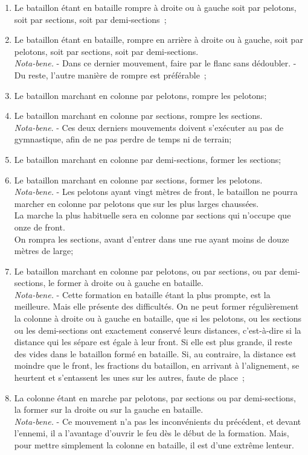 \documentclass[french,twoside]{book} %
\begin{document}
\begin{enumerate}[itemsep=0pt,]
\item Le bataillon étant en bataille rompre à droite ou à gauche soit par pelotons, soit par sections, soit par demi-sections ;
\item Le bataillon étant en bataille, rompre en arrière à droite ou à gauche, soit par pelotons, soit par sections, soit par demi-sections. \\
\emph{Nota-bene.} - Dans ce dernier mouvement, faire par le flanc sans dédoubler. - Du reste, l’autre manière de rompre est préférable ;
\item Le bataillon marchant en colonne par pelotons, rompre les pelotons;
\item Le bataillon marchant en colonne par sections, rompre les sections. \\
\emph{Nota-bene}. - Ces deux derniers mouvements doivent s’exécuter au pas de gymnastique, afin de ne pas perdre de temps ni de terrain;
\item Le bataillon marchant en colonne par demi-sections, former les sections;
\item Le bataillon marchant en colonne par sections, former les pelotons. \\
\emph{Nota-bene.} - Les pelotons ayant vingt mètres de front, le bataillon ne pourra marcher en colonne par pelotons que sur les plus larges chaussées. \\
La marche la plus habituelle sera en colonne par sections qui n’occupe que onze de front. \\
On rompra les sections, avant d’entrer dans une rue ayant moins de douze mètres de large;
\item Le bataillon marchant en colonne par pelotons, ou par sections, ou par demi-sections, le former à droite ou à gauche en bataille.\emph{ \\
Nota-bene.} - Cette formation en bataille étant la plus prompte, est la meilleure. Mais elle présente des difficultés. On ne peut former régulièrement la colonne à droite ou à gauche en bataille, que si les pelotons, ou les sections ou les demi-sections ont exactement conservé leurs distances, c’est-à-dire si la distance qui les sépare est égale à leur front. Si elle est plus grande, il reste des vides dans le bataillon formé en bataille. Si, au contraire, la distance est moindre que le front, les fractions du bataillon, en arrivant à l’alignement, se heurtent et s’entassent les unes sur les autres, faute de place ;
\item La colonne étant en marche par pelotons, par sections ou par demi-sections, la former sur la droite ou sur la gauche en bataille. \\
\emph{Nota-bene.} - Ce mouvement n’a pas les inconvénients du précédent, et devant l’ennemi, il a l’avantage d’ouvrir le feu dès le début de la formation. Mais, pour mettre simplement la colonne en bataille, il est d’une extrême lenteur.


\end{enumerate}
\end{document}
